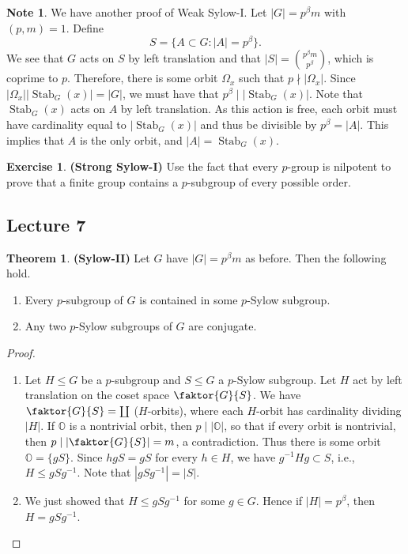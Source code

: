 \documentclass[10pt,letterpaper,cm]{nupset}
\theoremstyle{definition}
\newtheorem{note}{Note}
\newtheorem{theorem}{Theorem}
\newtheorem{exercise}{Exercise}
\newcommand{\1}{\mathbf{1}}
\newcommand{\0}{\vec 0}
\DeclareMathOperator{\stab}{Stab}
\begin{document}
\begin{note}
We have another proof of Weak Sylow-I. Let $|G| = p^{\beta}m$ with $(p, m) =1$. Define $$ S = \{A\subset G : |A| = p^{\beta}\}.$$ We see that $G$ acts on $S$ by left translation and that $|S| = {p^{\beta}m \choose p^{\beta}}$, which is coprime to $p$. Therefore, there is some orbit $\Omega_x$ such that $p \nmid  |\Omega_x|$. Since $|\Omega_x||\stab_G(x)| = |G|$, we must have that $p^{\beta} \mid |\stab_G(x)|$. Note that $\stab_G(x)$ acts on $A$ by left translation. As this action is free, each orbit must have cardinality equal to $|\stab_G(x)|$ and thus be divisible by $p^{\beta} =|A|$. This implies that $A$ is the only orbit, and $|A| = \stab_G(x)$.
\end{note}

\begin{exercise}{\textbf{(Strong Sylow-I)}}
Use the fact that every $p$-group is nilpotent to prove that a finite group contains a $p$-subgroup of every possible order.
\end{exercise}

\subsection{Lecture 7}

\begin{theorem}{\textbf{(Sylow-II)}} Let $G$ have $|G|= p^{\beta}m$ as before. Then the following hold.
\begin{enumerate}
\item Every $p$-subgroup of $G$ is contained in some $p$-Sylow subgroup.
\item Any two $p$-Sylow subgroups of $G$ are conjugate.
\end{enumerate}
\end{theorem}

\begin{proof} $ $
\begin{enumerate}
\item Let $H\leq G$ be a $p$-subgroup and $S\leq G$ a $p$-Sylow subgroup.  Let $H$ act by left translation on the coset space $\faktor{G}{S}$. We have $\faktor{G}{S} = \coprod$ ($H$-orbits), where each $H$-orbit has cardinality dividing $|H|$. If $\mathds{O}$ is a nontrivial orbit, then $p\mid |\mathds{O}|$, so that if every orbit is nontrivial, then $p\mid |\faktor{G}{S}| =m$, a contradiction. Thus there is some orbit $\mathds{O} = \{gS\}$. Since $hgS = gS$ for every $h\in H$, we have $g^{-1}Hg\subset S$, i.e., $H\leq gSg^{-1}$. Note that $|gSg^{-1}|=|S|$.
\item We just showed that $H\leq gSg^{-1}$ for some $g\in G$. Hence if $|H| = p^{\beta}$, then $H=gSg^{-1}$.
\end{enumerate}
\end{proof}
\end{document}
